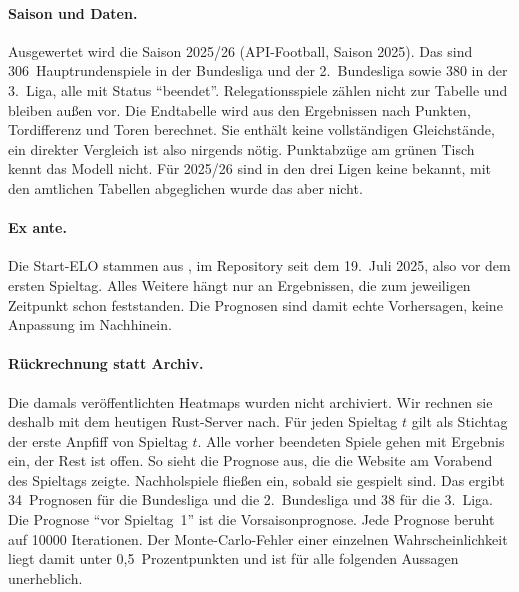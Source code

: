 \documentclass[11pt,a4paper,parskip=half,numbers=noenddot]{scrartcl}
\begin{document}
\paragraph{Saison und Daten.} Ausgewertet wird die Saison 2025/26
(API-Football, Saison 2025). Das sind 306~Hauptrundenspiele in der Bundesliga
und der 2.~Bundesliga sowie 380 in der 3.~Liga, alle mit Status
\enquote{beendet}. Relegationsspiele zählen nicht zur Tabelle und bleiben
außen vor. Die Endtabelle wird aus den Ergebnissen nach Punkten, Tordifferenz
und Toren berechnet. Sie enthält keine vollständigen Gleichstände, ein
direkter Vergleich ist also nirgends nötig. Punktabzüge am grünen Tisch kennt
das Modell nicht. Für 2025/26 sind in den drei Ligen keine bekannt, mit den
amtlichen Tabellen abgeglichen wurde das aber nicht.

\paragraph{Ex ante.} Die Start-ELO stammen aus
, im Repository seit dem 19.~Juli 2025, also
vor dem ersten Spieltag. Alles Weitere hängt nur an Ergebnissen, die zum
jeweiligen Zeitpunkt schon feststanden. Die Prognosen sind damit echte
Vorhersagen, keine Anpassung im Nachhinein.

\paragraph{Rückrechnung statt Archiv.} Die damals veröffentlichten Heatmaps
wurden nicht archiviert. Wir rechnen sie deshalb mit dem heutigen
Rust-Server nach. Für jeden Spieltag $t$ gilt als Stichtag der erste Anpfiff
von Spieltag $t$. Alle vorher beendeten Spiele gehen mit Ergebnis ein, der
Rest ist offen. So sieht die Prognose aus, die die Website am Vorabend des
Spieltags zeigte. Nachholspiele fließen ein, sobald sie gespielt sind. Das
ergibt 34~Prognosen für die Bundesliga und die 2.~Bundesliga und 38 für die
3.~Liga. Die Prognose \enquote{vor Spieltag~1} ist die Vorsaisonprognose. Jede
Prognose beruht auf \num{10000} Iterationen. Der Monte-Carlo-Fehler einer
einzelnen Wahrscheinlichkeit liegt damit unter 0,5~Prozentpunkten und ist
für alle folgenden Aussagen unerheblich.
\end{document}
